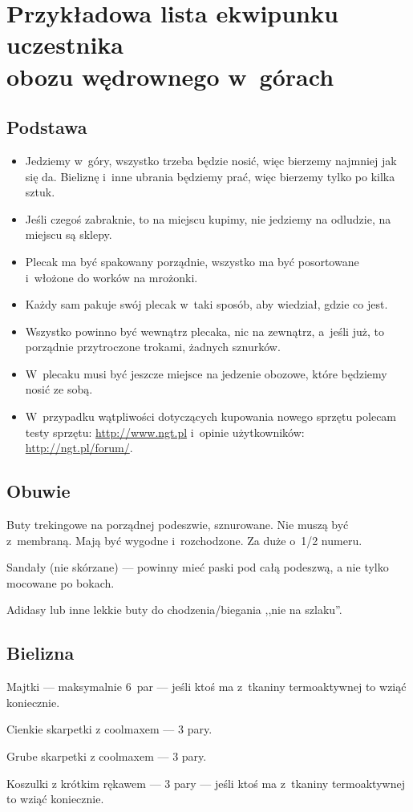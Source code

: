 \section{Przykładowa lista ekwipunku uczestnika\\obozu wędrownego w~górach\label{lista-ekwipunku-uczestnika}}
\subsection{Podstawa}
\begin{itemize}
\item Jedziemy w~góry, wszystko trzeba będzie nosić, więc bierzemy najmniej jak się da. Bieliznę i~inne ubrania będziemy prać, więc bierzemy tylko po kilka sztuk.
\item Jeśli czegoś zabraknie, to na miejscu kupimy, nie jedziemy na odludzie, na miejscu są sklepy.
\item Plecak ma być spakowany porządnie, wszystko ma być posortowane i~włożone do worków na mrożonki.
\item Każdy sam pakuje swój plecak w~taki sposób, aby wiedział, gdzie co jest.
\item Wszystko powinno być wewnątrz plecaka, nic na zewnątrz, a~jeśli już, to porządnie przytroczone trokami, żadnych sznurków.
\item W~plecaku musi być jeszcze miejsce na jedzenie obozowe, które będziemy nosić ze sobą.
\item W~przypadku wątpliwości dotyczących kupowania nowego sprzętu polecam testy sprzętu: \href{http://www.ngt.pl}{http://www.ngt.pl} i~opinie użytkowników: \href{http://ngt.pl/forum/}{http://ngt.pl/forum/}.
\end{itemize}

\subsection{Obuwie}
\begin{checklist}
\item Buty trekingowe na porządnej podeszwie, sznurowane. Nie muszą być z~membraną. Mają być wygodne i~rozchodzone. Za duże o~1/2 numeru.
\item Sandały (nie skórzane) --- powinny mieć paski pod całą podeszwą, a nie tylko mocowane po bokach.
\item Adidasy lub inne lekkie buty do chodzenia/biegania ,,nie na szlaku''.
\end{checklist}

\subsection{Bielizna}
\begin{checklist}
\item Majtki --- maksymalnie 6~par --- jeśli ktoś ma z~tkaniny termoaktywnej to wziąć koniecznie.
\item Cienkie skarpetki z coolmaxem --- 3 pary.
\item Grube skarpetki z coolmaxem --- 3 pary.
\item Koszulki z krótkim rękawem --- 3 pary --- jeśli ktoś ma z~tkaniny termoaktywnej to wziąć koniecznie.
\end{checklist}

